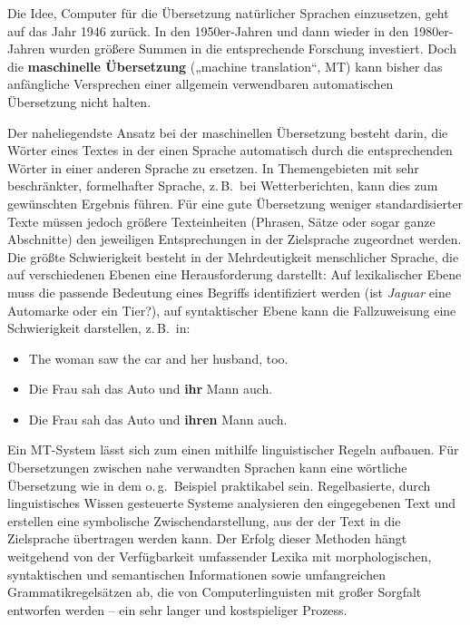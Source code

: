 \documentclass[]{../../metanetpaper}
\begin{document}
\begin{multicols}{2}
Die Idee, Computer für die Übersetzung natürlicher Sprachen einzusetzen, geht auf das Jahr 1946 zurück. In den 1950er-Jahren und dann wieder in den 1980er-Jahren wurden größere Summen in die entsprechende Forschung investiert. Doch die \textbf{maschinelle Übersetzung} („machine translation“, MT) kann bisher das anfängliche Versprechen einer allgemein verwendbaren automatischen Übersetzung nicht halten.


Der naheliegendste Ansatz bei der maschinellen Übersetzung besteht darin, die Wörter eines Textes in der einen Sprache automatisch durch die entsprechenden Wörter in einer anderen Sprache zu ersetzen. In Themengebieten mit sehr beschränkter, formelhafter Sprache, z.\,B.~bei Wetterberichten, kann dies zum gewünschten Ergebnis führen. Für eine gute Übersetzung weniger standardisierter Texte müssen jedoch größere Texteinheiten (Phrasen, Sätze oder sogar ganze Abschnitte) den jeweiligen Entsprechungen in der Zielsprache zugeordnet werden. Die größte Schwierigkeit besteht in der Mehrdeutigkeit menschlicher Sprache, die auf verschiedenen Ebenen eine Herausforderung darstellt: Auf lexikalischer Ebene muss die passende Bedeutung eines Begriffs identifiziert werden (ist \textit{Jaguar} eine Automarke oder ein Tier?), auf syntaktischer Ebene kann die Fallzuweisung eine Schwierigkeit darstellen, z.\,B.~in:

\begin{itemize}
\item[] The woman saw the car and her husband, too.
\item Die Frau sah das Auto und \textbf{ihr} Mann auch. 
\item Die Frau sah das Auto und \textbf{ihren} Mann auch.
\end{itemize}

Ein MT-System lässt sich zum einen mithilfe linguistischer Regeln aufbauen. Für Übersetzungen zwischen nahe verwandten Sprachen kann eine wörtliche Übersetzung wie in dem o.\,g.~Beispiel praktikabel sein. Regelbasierte, durch linguistisches Wissen gesteuerte Systeme analysieren den eingegebenen Text und erstellen eine symbolische Zwischendarstellung, aus der der Text in die Zielsprache übertragen werden kann. Der Erfolg dieser Methoden hängt weitgehend von der Verfügbarkeit umfassender Lexika mit morphologischen, syntaktischen und semantischen Informationen sowie umfangreichen Grammatikregelsätzen ab, die von Computerlinguisten mit großer Sorgfalt entworfen werden -- ein sehr langer und kostspieliger Prozess.


\end{multicols}
\end{document}
